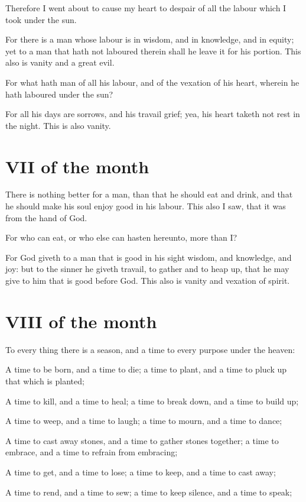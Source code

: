 \documentclass[0main.tex]{subfiles}
\begin{document}
Therefore I went about to cause my heart to despair of all the labour which I took under the sun.

For there is a man whose labour is in wisdom, and in knowledge, and in equity; yet to a man that hath not laboured therein shall he leave it for his portion. This also is vanity and a great evil.

For what hath man of all his labour, and of the vexation of his heart, wherein he hath laboured under the sun?

For all his days are sorrows, and his travail grief; yea, his heart taketh not rest in the night. This is also vanity.

\section*{VII of the month}

There is nothing better for a man, than that he should eat and drink, and that he should make his soul enjoy good in his labour. This also I saw, that it was from the hand of God.

For who can eat, or who else can hasten hereunto, more than I?

For God giveth to a man that is good in his sight wisdom, and knowledge, and joy: but to the sinner he giveth travail, to gather and to heap up, that he may give to him that is good before God. This also is vanity and vexation of spirit.

\section*{VIII of the month}

To every thing there is a season, and a time to every purpose under the heaven:

A time to be born, and a time to die; a time to plant, and a time to pluck up that which is planted;

A time to kill, and a time to heal; a time to break down, and a time to build up;

A time to weep, and a time to laugh; a time to mourn, and a time to dance;

A time to cast away stones, and a time to gather stones together; a time to embrace, and a time to refrain from embracing;

A time to get, and a time to lose; a time to keep, and a time to cast away;

A time to rend, and a time to sew; a time to keep silence, and a time to speak;
\end{document}
